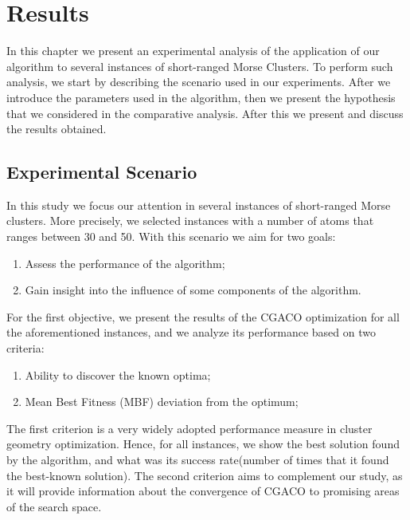 \chapter{Results}

In this chapter we present an experimental analysis of the application of our algorithm to several instances of short-ranged Morse Clusters. To perform such analysis, we start by describing the scenario used in our experiments. After we introduce the parameters used in the algorithm, then we present the hypothesis that we considered in the comparative analysis. After this we present and discuss the results obtained.




\section{Experimental Scenario}
\label{sec:experimental_scenario}
In this study we focus our attention in several instances of short-ranged Morse clusters. More precisely, we selected instances with a number of atoms that ranges between 30 and 50. With this scenario we aim for two goals: 
	\begin{enumerate}
		\item Assess the performance of the algorithm;
		\item Gain insight into the influence of some components of the algorithm. 
	\end{enumerate}
	
	For the first objective, we present the results of the CGACO optimization for all the aforementioned instances, and we analyze its performance based on two criteria:
	\begin{enumerate}
		\item Ability to discover the known optima;
		\item Mean Best Fitness (MBF) deviation from the optimum;
	\end{enumerate}
	
	The first criterion is a very widely adopted performance measure in cluster geometry optimization. Hence, for all instances, we show the best solution found by the algorithm, and what was its success rate(number of times that it found the best-known solution).
	The second criterion aims to complement our study, as it will provide information about the convergence of CGACO to promising areas of the search space.
	
